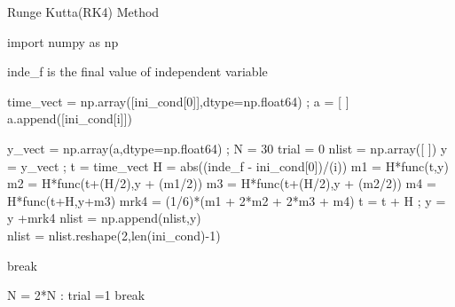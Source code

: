 \documentclass[12pt]{article}
\begin{document}
\begin{algorithm}
\caption{Runge Kutta(RK4) Method}

\begin{algorithmic}
\State import numpy as np

    \Comment inde\_f is the final value of independent variable
    
    \State time\_vect = np.array([ini\_cond[0]],dtype=np.float64) ; a = [ ]
        \State a.append([ini\_cond[i]])
        \EndFor
    
   \State y\_vect = np.array(a,dtype=np.float64)  ; N = 30
    \State trial = 0
       \State  nlist = np.array([ ])     
            \State y = y\_vect ; t = time\_vect
              \State  H = abs((inde\_f - ini\_cond[0])/(i))     
              \State  m1 = H*func(t,y)
              \State  m2 = H*func(t+(H/2),y + (m1/2))
               \State m3 = H*func(t+(H/2),y + (m2/2))
               \State m4 = H*func(t+H,y+m3)
               \State mrk4 = (1/6)*(m1 + 2*m2 + 2*m3 + m4)
               \State t = t + H ; y = y +mrk4 \EndFor
           \State nlist = np.append(nlist,y) \EndFor \\         
         
          \State nlist = nlist.reshape(2,len(ini\_cond)-1)  

       
              \State break
              
          \State  N = 2*N
        \Else :
         \State   trial =1              
         \State  break \EndIf \EndWhile
       

    
    \end{algorithmic}
\end{algorithm}
\end{document}
